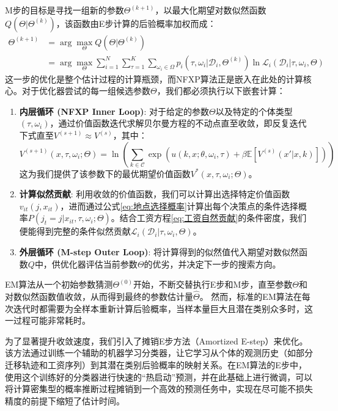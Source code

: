 \documentclass[
  a4paper,
  zihao=-4,
  fontset=mac,
  AutoFakeBold,
  AutoFakeSlant,
  oneside]{ctexbook}
\begin{document}
M步的目标是寻找一组新的参数$\Theta^{(k+1)}$，以最大化期望对数似然函数$Q(\Theta | \Theta^{(k)})$，该函数由E步计算的后验概率加权而成：
\begin{equation}
\begin{split}
    \Theta^{(k+1)} & = \arg\max_{\Theta} Q(\Theta | \Theta^{(k)}) 
    \\ & = \arg\max_{\Theta} \sum_{i=1}^{N} \sum_{\tau=1}^K \sum_{\omega_i \in \Omega} p_{i}(\tau, \omega_i | \mathcal{D}_i, \Theta^{(k)}) \ln \mathcal{L}_i(\mathcal{D}_i | \tau, \omega_i, \Theta)
\end{split}
\end{equation}
这一步的优化是整个估计过程的计算瓶颈，而NFXP算法正是嵌入在此处的计算核心。对于优化器尝试的每一组候选参数$\Theta$，我们都必须执行以下嵌套计算：
\begin{enumerate}
    \item \textbf{内层循环 (NFXP Inner Loop)}: 对于给定的参数$\Theta$以及特定的个体类型$(\tau, \omega_i)$，通过价值函数迭代求解贝尔曼方程的不动点直至收敛，即反复迭代下式直至$V^{(s+1)} \approx V^{(s)}$，其中：
    \begin{equation}
        V^{(s+1)}(x, \tau, \omega_i; \Theta) = \ln \left( \sum_{k \in \mathcal{C}} \exp \left( u(k, x; \theta, \omega_i, \tau) + \beta \mathbb{E}[V^{(s)}(x'|x,k)] \right) \right)
    \end{equation}
    这为我们提供了该参数下的最优期望价值函数$V^*(x, \tau, \omega_i; \Theta)$。

    \item \textbf{计算似然贡献}: 利用收敛的价值函数，我们可以计算出选择特定价值函数$v_{it}(j, x_{it})$，进而通过公式\eqref{eq:地点选择概率}计算出每个决策点的条件选择概率$P(j_t=j | x_{it}, \tau, \omega_i; \Theta)$。结合工资方程\eqref{eq:工资自然贡献}的条件密度，我们便能得到完整的条件似然贡献$\mathcal{L}_i(\mathcal{D}_i | \tau, \omega_i, \Theta)$。

    \item \textbf{外层循环 (M-step Outer Loop)}: 将计算得到的似然值代入期望对数似然函数$Q$中，供优化器评估当前参数$\Theta$的优劣，并决定下一步的搜索方向。
\end{enumerate}

EM算法从一个初始参数猜测$\Theta^{(0)}$开始，不断交替执行E步和M步，直至参数$\Theta$和对数似然函数值收敛，从而得到最终的参数估计量$\hat{\Theta}$。
然而，标准的EM算法在每次迭代时都需要为全样本重新计算后验概率，当样本量巨大且潜在类别众多时，这一过程可能非常耗时。

为了显著提升收敛速度，我们引入了摊销E步方法（Amortized E-step）来优化。该方法通过训练一个辅助的机器学习分类器，让它学习从个体的观测历史（如部分迁移轨迹和工资序列）到其潜在类别后验概率的映射关系。在EM算法的E步中，使用这个训练好的分类器进行快速的“热启动”预测，并在此基础上进行微调，可以将计算密集型的概率推断过程摊销到一个高效的预测任务中，实现在尽可能不损失精度的前提下缩短了估计时间。
\end{document}
